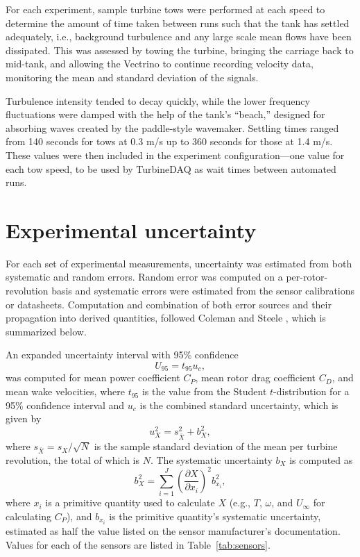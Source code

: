 For each experiment, sample turbine tows were performed at each speed to
determine the amount of time taken between runs such that the tank has settled
adequately, i.e., background turbulence and any large scale mean flows have been
dissipated. This was assessed by towing the turbine, bringing the carriage back
to mid-tank, and allowing the Vectrino to continue recording velocity data,
monitoring the mean and standard deviation of the signals.

Turbulence intensity tended to decay quickly, while the lower frequency
fluctuations were damped with the help of the tank's ``beach,'' designed for
absorbing waves created by the paddle-style wavemaker. Settling times ranged
from 140 seconds for tows at 0.3 m/s up to 360 seconds for those at 1.4 m/s.
These values were then included in the experiment configuration---one value for
each tow speed, to be used by TurbineDAQ as wait times between automated runs.


\section{Experimental uncertainty}\label{sec:uncertainty}

For each set of experimental measurements, uncertainty was estimated from both
systematic and random errors. Random error was computed on a
per-rotor-revolution basis and systematic errors were estimated from the sensor
calibrations or datasheets. Computation and combination of both error sources
and their propagation into derived quantities, followed Coleman and Steele
\cite{ColemanSteele}, which is summarized below.

An expanded uncertainty interval with 95\% confidence
\begin{equation}
    U_{95} = t_{95} u_c,
\end{equation}
was computed for mean power coefficient $C_P$, mean rotor drag coefficient
$C_D$, and mean wake velocities, where $t_{95}$ is the value from the Student
$t$-distribution for a 95\% confidence interval and $u_c$ is the combined
standard uncertainty, which is given by
\begin{equation}
    u_X^2 = s_{\bar{X}}^2 + b_X^2,
\end{equation}
where $s_{\bar{X}} = s_X/\sqrt{N}$ is the sample standard deviation of the mean
per turbine revolution, the total of which is $N$. The systematic uncertainty
$b_X$ is computed as
\begin{equation}
    b_{X}^2 = \sum_{i=1}^J \left( \frac{\partial X}{\partial x_i} \right)^2
    b_{x_i}^2,
\end{equation}
where $x_i$ is a primitive quantity used to calculate $X$ (e.g., $T$, $\omega$,
and $U_\infty$ for calculating $C_P$), and $b_{x_i}$ is the primitive quantity's
systematic uncertainty, estimated as half the value listed on the sensor
manufacturer's documentation. Values for each of the sensors are listed in
Table~\ref{tab:sensors}.

